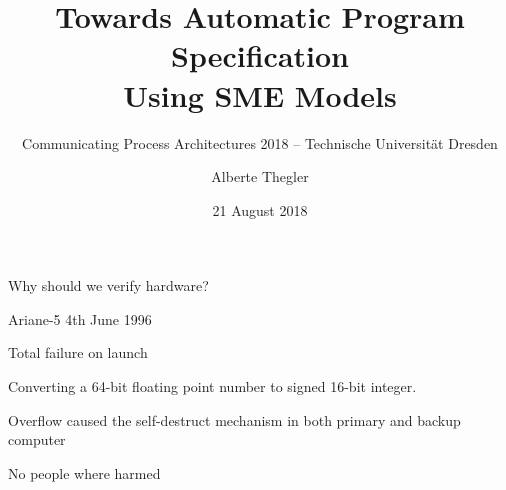 \documentclass[13pt]{beamer}
\title[Towards Automatic Program Specification Using SME Models]{Towards Automatic Program Specification \\ Using SME Models}
\subtitle{\tiny Communicating Process Architectures 2018 -- Technische Universität Dresden}
\author[A. Thegler]{Alberte Thegler}
\institute[Niels Bohr Institute]{Niels Bohr Institute, University of Copenhagen, Denmark}
\date[August 21]{21 August 2018}
\newcommand{\cspm}{CSP$_M$}
\begin{document}
\frame[plain]{\titlepage}


\begin{frame}{Why should we verify hardware?}
  \begin{block}{Ariane-5}
    4th June 1996
  \end{block}

  \pause

  \begin{block}{}
     Total failure on launch
  \end{block}

  \pause

  \begin{block}{}
     Converting a 64-bit floating point number to signed 16-bit integer.
  \end{block}

  \pause

  \begin{block}{}
    Overflow caused the self-destruct mechanism in both primary and backup computer
  \end{block}

  \pause

  \begin{block}{}
     No people where harmed
  \end{block}

\end{frame}
\end{document}
